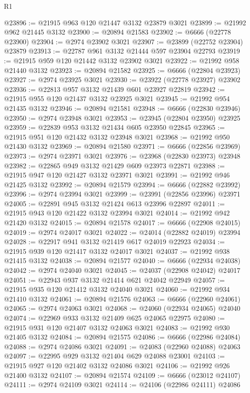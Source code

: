 \begin{lexlean}{R1}
\begin{coremodule}
@23896 := @21915 @963 @120 @21447 @3132 @23879 @3021
@23899 := @21992 @962 @21445 @3132
@23900 := @20894 @21583
@23902 := @6666 (@22778 @23900)
@23904 := @2974 @23902 @3021
@23907 := @23899 (@22752 @23904) @23879
@23913 := @22787 @961 @3132 @21444 @597 @23904 @22793
@23919 := @21915 @959 @120 @21442 @3132 @23902 @3021
@23922 := @21992 @958 @21440 @3132
@23923 := @20894 @21582
@23925 := @6666 (@22804 @23923)
@23927 := @2974 @23925 @3021
@23930 := @23922 (@22778 @23927) @23902
@23936 := @22813 @957 @3132 @21439 @601 @23927 @22819
@23942 := @21915 @955 @120 @21437 @3132 @23925 @3021
@23945 := @21992 @954 @21435 @3132
@23946 := @20894 @21581
@23948 := @6666 (@22830 @23946)
@23950 := @2974 @23948 @3021
@23953 := @23945 (@22804 @23950) @23925
@23959 := @22839 @953 @3132 @21434 @605 @23950 @22845
@23965 := @21915 @951 @120 @21432 @3132 @23948 @3021
@23968 := @21992 @950 @21430 @3132
@23969 := @20894 @21580
@23971 := @6666 (@22856 @23969)
@23973 := @2974 @23971 @3021
@23976 := @23968 (@22830 @23973) @23948
@23982 := @22865 @949 @3132 @21429 @609 @23973 @22871
@23988 := @21915 @947 @120 @21427 @3132 @23971 @3021
@23991 := @21992 @946 @21425 @3132
@23992 := @20894 @21579
@23994 := @6666 (@22882 @23992)
@23996 := @2974 @23994 @3021
@23999 := @23991 (@22856 @23996) @23971
@24005 := @22891 @945 @3132 @21424 @613 @23996 @22897
@24011 := @21915 @943 @120 @21422 @3132 @23994 @3021
@24014 := @21992 @942 @21420 @3132
@24015 := @20894 @21578
@24017 := @6666 (@22908 @24015)
@24019 := @2974 @24017 @3021
@24022 := @24014 (@22882 @24019) @23994
@24028 := @22917 @941 @3132 @21419 @617 @24019 @22923
@24034 := @21915 @939 @120 @21417 @3132 @24017 @3021
@24037 := @21992 @938 @21415 @3132
@24038 := @20894 @21577
@24040 := @6666 (@22934 @24038)
@24042 := @2974 @24040 @3021
@24045 := @24037 (@22908 @24042) @24017
@24051 := @22943 @937 @3132 @21414 @621 @24042 @22949
@24057 := @21915 @935 @120 @21412 @3132 @24040 @3021
@24060 := @21992 @934 @21410 @3132
@24061 := @20894 @21576
@24063 := @6666 (@22960 @24061)
@24065 := @2974 @24063 @3021
@24068 := @24060 (@22934 @24065) @24040
@24074 := @22969 @933 @3132 @21409 @625 @24065 @22975
@24080 := @21915 @931 @120 @21407 @3132 @24063 @3021
@24083 := @21992 @930 @21405 @3132
@24084 := @20894 @21575
@24086 := @6666 (@22986 @24084)
@24088 := @2974 @24086 @3021
@24091 := @24083 (@22960 @24088) @24063
@24097 := @22995 @929 @3132 @21404 @629 @24088 @23001
@24103 := @21915 @927 @120 @21402 @3132 @24086 @3021
@24106 := @21992 @926 @21400 @3132
@24107 := @20894 @21574
@24109 := @6666 (@23012 @24107)
@24111 := @2974 @24109 @3021
@24114 := @24106 (@22986 @24111) @24086

\end{coremodule}
\end{lexlean}
